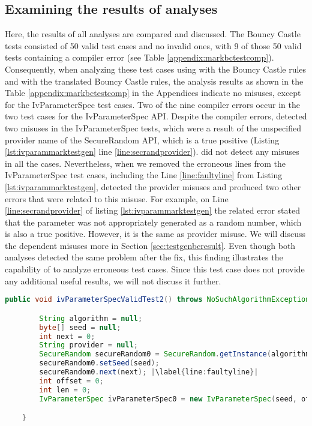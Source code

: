 \subsection{Examining the results of analyses}
Here, the results of all analyses are compared and discussed.
The \MARK{} Bouncy Castle tests consisted of 50 valid test cases and no invalid ones, with 9 of those 50 valid tests containing a compiler error (see Table \ref{appendix:markbctestcomp}). Consequently, when analyzing these test cases using \codyze{} with the Bouncy Castle \MARK{} rules and \cognicryptsast{} with the translated Bouncy Castle \crysl{} rules, the analysis results as shown in the Table \ref{appendix:markbctestcomp} in the Appendices indicate no misuses, except for the IvParameterSpec test cases. Two of the nine compiler errors occur in the two test cases for the IvParameterSpec API. Despite the compiler errors, \codyze{} detected two misuses in the IvParameterSpec tests, which were a result of the unspecified provider name of the SecureRandom API, which is a true positive (Listing \ref{lst:ivparammarktestgen} line \ref{line:secrandprovider}). \cognicryptsast{} did not detect any misuses in all the cases. Nevertheless, when we removed the erroneous lines from the IvParameterSpec test cases, including the Line \ref{line:faultyline} from Listing \ref{lst:ivparammarktestgen}, \cognicryptsast{} detected the provider misuses and produced two other errors that were related to this misuse. For example, on Line \ref{line:secrandprovider} of listing \ref{lst:ivparammarktestgen} the related error stated that the  parameter was not appropriately generated as a random number, which is also a true positive. However, it is the same as provider misuse. We will discuss the dependent misuses more in Section \ref{sec:testgenbcresult}. Even though both analyses detected the same problem after the fix, this finding illustrates the capability of \codyze{} to analyze erroneous test cases. Since this test case does not provide any additional useful results, we will not discuss it further.

\begin{lstlisting}[language=Java, caption=A faulty test case from \MARK{} Bouncy Castle test, label={lst:ivparammarktestgen}, escapechar=|]
	public void ivParameterSpecValidTest2() throws NoSuchAlgorithmException, NoSuchProviderException {

		String algorithm = null;
		byte[] seed = null;
		int next = 0;
		String provider = null;
		SecureRandom secureRandom0 = SecureRandom.getInstance(algorithm, provider);|\label{line:secrandprovider}|
		secureRandom0.setSeed(seed);
		secureRandom0.next(next); |\label{line:faultyline}|
		int offset = 0;
		int len = 0;
		IvParameterSpec ivParameterSpec0 = new IvParameterSpec(seed, offset, len);

	}
\end{lstlisting}

